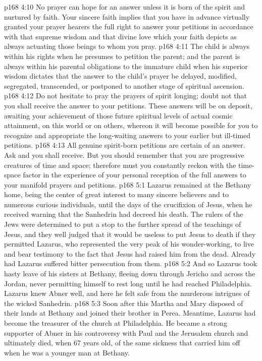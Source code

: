 \pc \vs p168 4:10 \bibnobreakspace No prayer can hope for an answer unless it is born of the spirit and nurtured by faith. Your sincere faith implies that you have in advance virtually granted your prayer hearers the full right to answer your petitions in accordance with that supreme wisdom and that divine love which your faith depicts as always actuating those beings to whom you pray.\plusone
\pc \vs p168 4:11 \bibnobreakspace The child is always within his rights when he presumes to petition the parent; and the parent is always within his parental obligations to the immature child when his superior wisdom dictates that the answer to the child’s prayer be delayed, modified, segregated, transcended, or postponed to another stage of spiritual ascension.\plusone
\pc \vs p168 4:12 \bibnobreakspace Do not hesitate to pray the prayers of spirit longing; doubt not that you shall receive the answer to your petitions. These answers will be on deposit, awaiting your achievement of those future spiritual levels of actual cosmic attainment, on this world or on others, whereon it will become possible for you to recognize and appropriate the long\hyp{}waiting answers to your earlier but ill\hyp{}timed petitions.
\pc \vs p168 4:13 \bibnobreakspace All genuine spirit\hyp{}born petitions are certain of an answer. Ask and you shall receive. But you should remember that you are progressive creatures of time and space; therefore must you constantly reckon with the time\hyp{}space factor in the experience of your personal reception of the full answers to your manifold prayers and petitions.
\vs p168 5:1 Lazarus remained at the Bethany home, being the center of great interest to many sincere believers and to numerous curious individuals, until the days of the crucifixion of Jesus, when he received warning that the Sanhedrin had decreed his death. The rulers of the Jews were determined to put a stop to the further spread of the teachings of Jesus, and they well judged that it would be useless to put Jesus to death if they permitted Lazarus, who represented the very peak of his wonder\hyp{}working, to live and bear testimony to the fact that Jesus had raised him from the dead. Already had Lazarus suffered bitter persecution from them.
\vs p168 5:2 And so Lazarus took hasty leave of his sisters at Bethany, fleeing down through Jericho and across the Jordan, never permitting himself to rest long until he had reached Philadelphia. Lazarus knew Abner well, and here he felt safe from the murderous intrigues of the wicked Sanhedrin.
\vs p168 5:3 Soon after this Martha and Mary disposed of their lands at Bethany and joined their brother in Perea. Meantime, Lazarus had become the treasurer of the church at Philadelphia. He became a strong supporter of Abner in his controversy with Paul and the Jerusalem church and ultimately died, when 67 years old, of the same sickness that carried him off when he was a younger man at Bethany.

